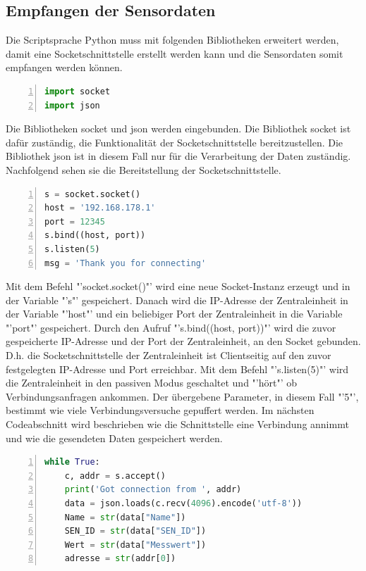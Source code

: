 \subsection{Empfangen der Sensordaten}
Die Scriptsprache Python muss mit folgenden Bibliotheken erweitert werden, damit eine Socketschnittstelle erstellt werden kann und die Sensordaten somit empfangen werden können.
\begin{lstlisting}[caption=Einbinden der Bibliotheken für die Schnittstelle,frame=single,numbers=left,language=Python]
import socket
import json
\end{lstlisting}
Die Bibliotheken socket und json werden eingebunden. Die Bibliothek socket ist dafür zuständig, die Funktionalität der Socketschnittstelle bereitzustellen. Die Bibliothek json ist in diesem Fall nur für die Verarbeitung der Daten zuständig.\hfill
\noindent Nachfolgend sehen sie die Bereitstellung der Socketschnittstelle.
\begin{lstlisting}[caption=Bereitstellen der Socketschnittstelle,frame=single,numbers=left,language=Python,showstringspaces=false]
s = socket.socket()
host = '192.168.178.1'
port = 12345
s.bind((host, port))
s.listen(5)
msg = 'Thank you for connecting'
\end{lstlisting}
Mit dem Befehl "'socket.socket()"' wird eine neue Socket-Instanz erzeugt und in der Variable "'s"' gespeichert. Danach wird die IP-Adresse der Zentraleinheit in der Variable "'host"' und ein beliebiger Port der Zentraleinheit in die Variable "'port"' gespeichert. Durch den Aufruf "'s.bind((host, port))"' wird die zuvor gespeicherte IP-Adresse und der Port der Zentraleinheit, an den Socket gebunden. D.h. die Socketschnittstelle der Zentraleinheit ist Clientseitig auf den zuvor festgelegten IP-Adresse und Port erreichbar. Mit dem Befehl "'s.listen(5)"' wird die Zentraleinheit in den passiven Modus geschaltet und "'hört"' ob Verbindungsanfragen ankommen. Der übergebene Parameter, in diesem Fall "'5"', bestimmt wie viele Verbindungsversuche gepuffert werden.
\noindent Im nächsten Codeabschnitt wird beschrieben wie die Schnittstelle eine Verbindung annimmt und wie die gesendeten Daten gespeichert werden.
\begin{lstlisting}[caption=Speichern der Daten,frame=single,numbers=left,language=Python,showstringspaces=false]
while True:
	c, addr = s.accept()
	print('Got connection from ', addr)
	data = json.loads(c.recv(4096).encode('utf-8'))
	Name = str(data["Name"])
	SEN_ID = str(data["SEN_ID"])
	Wert = str(data["Messwert"])
	adresse = str(addr[0])
\end{lstlisting}\label{Daten}
